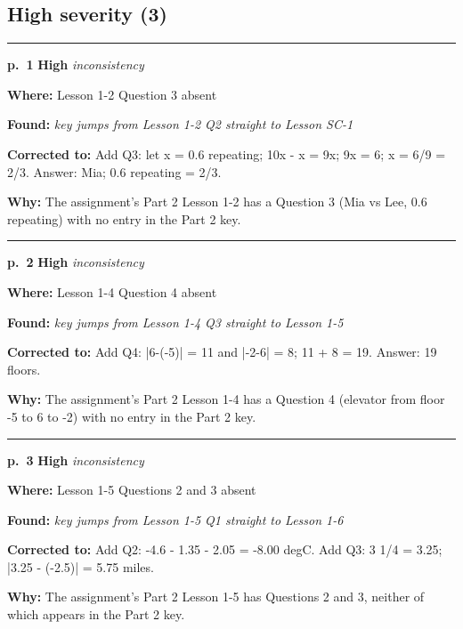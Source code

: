 \documentclass[11pt]{article}
\newcommand{\sevhigh}[1]{\textcolor{red!75!black}{\textbf{#1}}}
\begin{document}
\subsection*{High severity (3)}
\noindent\rule{\textwidth}{0.4pt}\par\nobreak\vspace{2pt}
\noindent\textbf{p.~1} \quad \sevhigh{High} \quad \textit{inconsistency}\par
\noindent\textbf{Where: }Lesson 1-2 Question 3 absent\par
\noindent\textbf{Found: }\textit{key jumps from Lesson 1-2 Q2 straight to Lesson SC-1}\par
\noindent\textbf{Corrected to: }Add Q3: let x = 0.6 repeating; 10x - x = 9x; 9x = 6; x = 6/9 = 2/3. Answer: Mia; 0.6 repeating = 2/3.\par
\noindent\textbf{Why: }The assignment's Part 2 Lesson 1-2 has a Question 3 (Mia vs Lee, 0.6 repeating) with no entry in the Part 2 key.\par\vspace{4pt}
\noindent\rule{\textwidth}{0.4pt}\par\nobreak\vspace{2pt}
\noindent\textbf{p.~2} \quad \sevhigh{High} \quad \textit{inconsistency}\par
\noindent\textbf{Where: }Lesson 1-4 Question 4 absent\par
\noindent\textbf{Found: }\textit{key jumps from Lesson 1-4 Q3 straight to Lesson 1-5}\par
\noindent\textbf{Corrected to: }Add Q4: |6-(-5)| = 11 and |-2-6| = 8; 11 + 8 = 19. Answer: 19 floors.\par
\noindent\textbf{Why: }The assignment's Part 2 Lesson 1-4 has a Question 4 (elevator from floor -5 to 6 to -2) with no entry in the Part 2 key.\par\vspace{4pt}
\noindent\rule{\textwidth}{0.4pt}\par\nobreak\vspace{2pt}
\noindent\textbf{p.~3} \quad \sevhigh{High} \quad \textit{inconsistency}\par
\noindent\textbf{Where: }Lesson 1-5 Questions 2 and 3 absent\par
\noindent\textbf{Found: }\textit{key jumps from Lesson 1-5 Q1 straight to Lesson 1-6}\par
\noindent\textbf{Corrected to: }Add Q2: -4.6 - 1.35 - 2.05 = -8.00 degC. Add Q3: 3 1/4 = 3.25; |3.25 - (-2.5)| = 5.75 miles.\par
\noindent\textbf{Why: }The assignment's Part 2 Lesson 1-5 has Questions 2 and 3, neither of which appears in the Part 2 key.\par\vspace{4pt}
\end{document}
